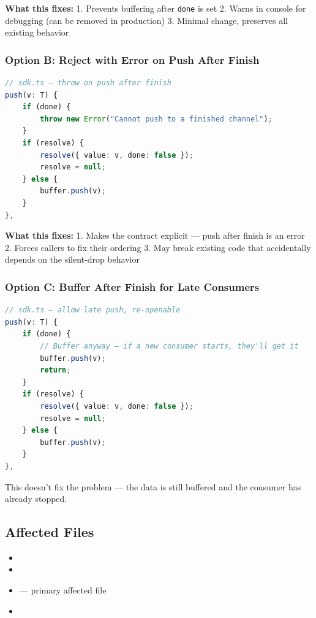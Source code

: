 \textbf{What this fixes:}
1. Prevents buffering after \texttt{done} is set
2. Warns in console for debugging (can be removed in production)
3. Minimal change, preserves all existing behavior

\subsubsection*{Option B: Reject with Error on Push After Finish}



\begin{lstlisting}[language=TypeScript]
// sdk.ts — throw on push after finish
push(v: T) {
    if (done) {
        throw new Error("Cannot push to a finished channel");
    }
    if (resolve) {
        resolve({ value: v, done: false });
        resolve = null;
    } else {
        buffer.push(v);
    }
},

\end{lstlisting}



\textbf{What this fixes:}
1. Makes the contract explicit — push after finish is an error
2. Forces callers to fix their ordering
3. May break existing code that accidentally depends on the silent-drop behavior

\subsubsection*{Option C: Buffer After Finish for Late Consumers}



\begin{lstlisting}[language=TypeScript]
// sdk.ts — allow late push, re-openable
push(v: T) {
    if (done) {
        // Buffer anyway — if a new consumer starts, they'll get it
        buffer.push(v);
        return;
    }
    if (resolve) {
        resolve({ value: v, done: false });
        resolve = null;
    } else {
        buffer.push(v);
    }
},

\end{lstlisting}



This doesn't fix the problem — the data is still buffered and the consumer has already stopped.


\subsection*{Affected Files}
\begin{itemize}
    \item {}
    \item {}
    \item {} — primary affected file
    \item {}
\end{itemize}

